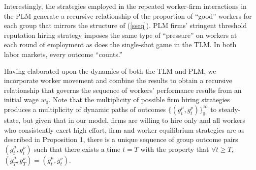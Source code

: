 \documentclass[sigconf]{acmart}
\theoremstyle{definition}
\begin{document}
Interestingly, the strategies employed in the repeated worker-firm interactions in the PLM generate a recursive relationship of the proportion of ``good'' workers for each group that mirrors the structure of (\ref{sseq}). PLM firms' stringent threshold reputation hiring strategy imposes the same type of ``pressure'' on workers at each round of employment as does the single-shot game in the TLM. In both labor markets, every outcome ``counts.''





Having elaborated upon the dynamics of both the TLM and PLM, we incorporate worker movement and combine the results to obtain a recursive relationship that governs the sequence of workers' performance results from an initial wage $w_0$. Note that the multiplicity of possible firm hiring strategies produces a multiplicity of dynamic paths of outcomes $\{(g^\mu_t, g^\nu_t)\}^\infty_0$ to steady-state, but given that in our model, firms are willing to hire only and all workers who consistently exert high effort, firm and worker equilibrium strategies are as described in Proposition 1, there is a unique sequence of group outcome pairs $(g^\mu_t, g^\nu_t)$ such that there exists a time $t = T$ with the property that $\forall t \ge T$, $(g^\mu_{T}, g^\nu_{T}) = (g^\mu_{t}, g^\nu_{t})$. 
\end{document}
